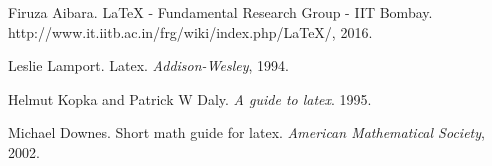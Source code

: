 \documentclass[a4paper, 12pt, fullpage]{article}
\begin{document}
\begin{thebibliography}{9}
Firuza Aibara. LaTeX - Fundamental Research Group - IIT Bombay.
http://www.it.iitb.ac.in/frg/wiki/index.php/LaTeX/, 2016.

Leslie Lamport. Latex. \textsl{Addison-Wesley}, 1994.

Helmut Kopka and Patrick W Daly. \textsl{A guide to latex}. 1995.

Michael Downes. Short math guide for latex. \textsl{American Mathematical Society}, 2002.

\end{thebibliography}
 
\end{document}
